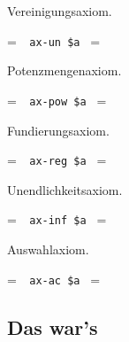 \noindent Vereinigungsaxiom.

\setbox\startprefix=\hbox{\tt \ \ ax-un\ \$a\ }
\setbox\contprefix=\hbox{\tt \ \ \ \ \ \ \ \ \ \ \ }
\startm
\m{\vdash}\m{\exists}\m{\forall}\m{(}\m{\exists}\m{(}\m{
\in}\m{\wedge}\m{\in}\m{)}\m{\rightarrow}\m{\in}\m{)}
\endm

\noindent Potenzmengenaxiom.

\setbox\startprefix=\hbox{\tt \ \ ax-pow\ \$a\ }
\setbox\contprefix=\hbox{\tt \ \ \ \ \ \ \ \ \ \ \ \ }
\startm
\m{\vdash}\m{\exists}\m{\forall}\m{(}\m{\forall}\m{(}\m{
\in}\m{\rightarrow}\m{\in}\m{)}\m{\rightarrow}\m{\in}
\m{)}
\endm

\noindent Fundierungsaxiom.

\setbox\startprefix=\hbox{\tt \ \ ax-reg\ \$a\ }
\setbox\contprefix=\hbox{\tt \ \ \ \ \ \ \ \ \ \ \ \ }
\startm
\m{\vdash}\m{(}\m{\exists}\m{\in}\m{\rightarrow}\m{\exists}
\m{(}\m{\in}\m{\wedge}\m{\forall}\m{(}\m{\in}\m{
\rightarrow}\m{\lnot}\m{\in}\m{)}\m{)}\m{)}
\endm

\noindent Unendlichkeitsaxiom.

\setbox\startprefix=\hbox{\tt \ \ ax-inf\ \$a\ }
\setbox\contprefix=\hbox{\tt \ \ \ \ \ \ \ \ \ \ \ \ \ \ \ }
\startm
\m{\vdash}\m{\exists}\m{(}\m{\in}\m{\wedge}\m{\forall}%
\m{(}\m{\in}\m{\rightarrow}\m{\exists}\m{(}\m{\in}\m{%
\wedge}\m{\in}\m{)}\m{)}\m{)}
\endm

\noindent Auswahlaxiom.

\setbox\startprefix=\hbox{\tt \ \ ax-ac\ \$a\ }
\setbox\contprefix=\hbox{\tt \ \ \ \ \ \ \ \ \ \ \ \ \ \ }
\startm
\m{\vdash}\m{\exists}\m{\forall}\m{\forall}\m{(}\m{(}\m{%
\in}\m{\wedge}\m{\in}\m{)}\m{\rightarrow}\m{\exists}\m{%
\forall}\m{(}\m{\exists}\m{(}\m{(}\m{\in}\m{\wedge}%
\m{\in}\m{)}\m{\wedge}\m{(}\m{\in}\m{\wedge}\m{\in}%
\m{)}\m{)}\m{\leftrightarrow}\m{=}\m{)}\m{)}
\endm

\subsection{Das war's}

